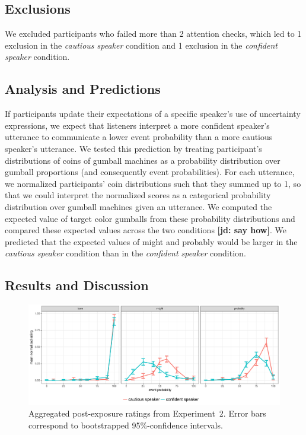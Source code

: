 \documentclass[lucida,biblatex]{sp} %
\newcommand{\jd}[1]{\textcolor{PinkyPurple}{\textbf{[jd: #1]}}}
\begin{document}
\subsection{Exclusions}

We excluded participants who failed more than 2 attention checks, which led to 1 exclusion in the \emph{cautious speaker} condition and 1 exclusion in the \emph{confident speaker} condition.


\subsection{Analysis and Predictions}

If participants update their expectations of a specific speaker's use of uncertainty expressions,  we expect that listeners interpret a more confident speaker's utterance 
to communicate a lower event probability than a more cautious speaker's utterance. We tested this prediction by treating participant's distributions of coins 
of gumball machines as a probability distribution over gumball proportions (and consequently event probabilities).  For each utterance, we 
normalized participants' coin distributions such that they summed up to 1, so that we could interpret the normalized scores 
as a categorical probability distribution over gumball machines given an utterance. We computed the expected value of target color gumballs 
from these probability distributions and compared these expected values across the two conditions \jd{say how}. We predicted that the expected values of 
{\sc might} and {\sc probably} would be larger in the \emph{cautious speaker} condition than in the \emph{confident speaker} condition.

\subsection{Results and Discussion}

\begin{figure}
\includegraphics[width=\textwidth]{plots/exp-2-ratings.pdf}
\caption{Aggregated post-exposure ratings from Experiment~2. Error bars correspond to bootstrapped 95\%-confidence intervals.  \label{fig:adaptation-results-comp}}
\end{figure}
\end{document}
